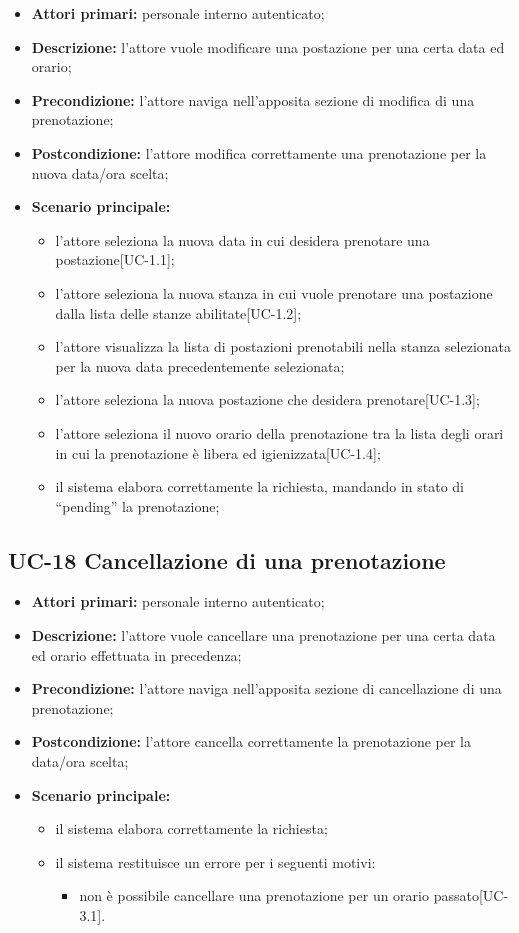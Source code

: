 \begin{itemize}
\item \textbf{Attori primari:} personale interno autenticato;
\item \textbf{Descrizione:} l'attore vuole modificare una postazione per una certa data ed orario;
\item \textbf{Precondizione:} l'attore naviga nell’apposita sezione di modifica di una prenotazione;
\item \textbf{Postcondizione:} l'attore modifica correttamente una prenotazione per la nuova data/ora scelta;
\item \textbf{Scenario principale:} 
	\begin{itemize}
		\item l'attore seleziona la nuova data in cui desidera prenotare una postazione[UC-1.1];
		\item l'attore seleziona la nuova stanza in cui vuole prenotare una postazione dalla lista delle stanze abilitate[UC-1.2];
		\item l'attore visualizza la lista di postazioni prenotabili nella stanza selezionata per la nuova data precedentemente selezionata;
		\item l'attore seleziona la nuova postazione che desidera prenotare[UC-1.3];
		\item l'attore seleziona il nuovo orario della prenotazione tra la lista degli orari in cui la prenotazione è libera ed igienizzata[UC-1.4];
		\item il sistema elabora correttamente la richiesta, mandando in stato di “pending” la prenotazione;
	\end{itemize}
\end{itemize}

\subsection{UC-18 Cancellazione di una prenotazione}

\begin{itemize}
\item \textbf{Attori primari:} personale interno autenticato;
\item \textbf{Descrizione:} l'attore vuole cancellare una prenotazione per una certa data ed orario effettuata in precedenza;
\item \textbf{Precondizione:} l'attore naviga nell’apposita sezione di cancellazione di una prenotazione;
\item \textbf{Postcondizione:} l'attore cancella correttamente la prenotazione per la data/ora scelta;
\item \textbf{Scenario principale:} 
	\begin{itemize}
		\item il sistema elabora correttamente la richiesta;
		\item il sistema restituisce un errore per i seguenti motivi:
		\begin{itemize}
			\item non è possibile cancellare una prenotazione per un orario passato[UC-3.1].
		\end{itemize}
	\end{itemize}
\end{itemize}

